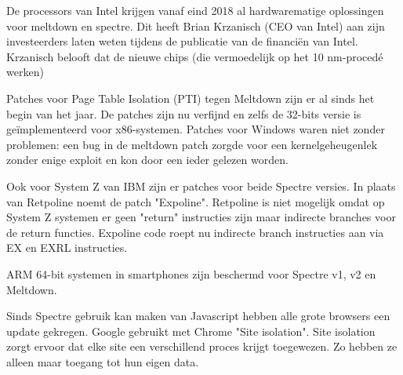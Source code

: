 De processors van Intel krijgen vanaf eind 2018 al hardwarematige oplossingen voor meltdown en spectre.
Dit heeft Brian Krzanisch (CEO van Intel) aan zijn investeerders laten weten tijdens de publicatie van de financiën van Intel. Krzanisch belooft dat de nieuwe chips (die vermoedelijk op het 10 nm-procedé werken)

Patches voor Page Table Isolation (PTI) tegen Meltdown zijn er al sinds het begin van het jaar. De patches zijn nu verfijnd en zelfs de 32-bits versie is geïmplementeerd voor x86-systemen.
Patches voor Windows waren niet zonder problemen: een bug in de meltdown patch zorgde voor een kernelgeheugenlek zonder enige exploit en kon door een ieder gelezen worden.

Ook voor System Z van IBM zijn er patches voor beide Spectre versies.
In plaats van Retpoline noemt de patch "Expoline".
Retpoline is niet mogelijk omdat op System Z systemen er geen "return" instructies zijn maar indirecte branches voor de return functies. Expoline code roept nu indirecte branch instructies aan via EX en EXRL instructies.

ARM 64-bit systemen in smartphones zijn beschermd voor Spectre v1, v2 en Meltdown.

Sinds Spectre gebruik kan maken van Javascript hebben alle grote browsers een update gekregen.
Google gebruikt met Chrome "Site isolation". Site isolation zorgt ervoor dat elke site een verschillend proces krijgt toegewezen. Zo hebben ze alleen maar toegang tot hun eigen data.

